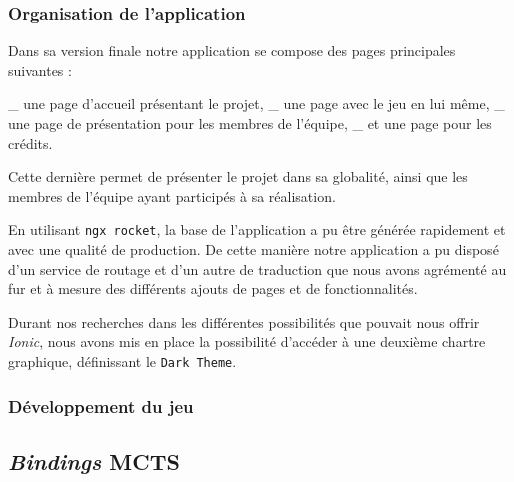 \documentclass[a4paper,11pt]{article}
\begin{document}
\hypertarget{organisation-de-lapplication}{%
\subsubsection{Organisation de
l'application}\label{organisation-de-lapplication}}

Dans sa version finale notre application se compose des pages
principales suivantes :

\_ une page d'accueil présentant le projet, \_ une page avec le jeu en
lui même, \_ une page de présentation pour les membres de l'équipe, \_
et une page pour les crédits.

Cette dernière permet de présenter le projet dans sa globalité, ainsi
que les membres de l'équipe ayant participés à sa réalisation.

En utilisant \texttt{ngx\ rocket}, la base de l'application a pu être
générée rapidement et avec une qualité de production. De cette manière
notre application a pu disposé d'un service de routage et d'un autre de
traduction que nous avons agrémenté au fur et à mesure des différents
ajouts de pages et de fonctionnalités.

Durant nos recherches dans les différentes possibilités que pouvait nous
offrir \emph{Ionic}, nous avons mis en place la possibilité d'accéder à
une deuxième chartre graphique, définissant le \texttt{Dark\ Theme}.

\hypertarget{duxe9veloppement-du-jeu}{%
\subsubsection{Développement du jeu}\label{duxe9veloppement-du-jeu}}

\hypertarget{bindings-mcts}{%
\subsection{\texorpdfstring{\emph{Bindings}
MCTS}{Bindings MCTS}}\label{bindings-mcts}}

% 

\end{document}

